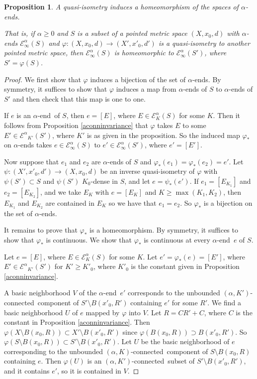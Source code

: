 \documentclass[10pt,a4paper]{amsart}
\newtheorem{proposition}{Proposition}
\newcommand{\aend}{$\alpha$-end}
\newcommand{\akconn}{$(\alpha,K)$-connected}
\newcommand{\akpconn}{$(\alpha,K')$-connected}
\newcommand{\caleinf}{{\mathcal E}^\alpha_\infty}
\newcommand{\calek}{{\mathcal E}^\alpha_K}
\newcommand{\calekp}{{\mathcal E^\alpha}_{K'}}
\newcommand{\ph}{\varphi}
\begin{document}
\begin{proposition}\label{aendinvariance}
A quasi-isometry induces a homeomorphism of the spaces of \aend s.

That is, if $\alpha \geq 0$ and $S$ is a subset of a pointed metric
space $(X,x_0,d)$ with \aend s $\caleinf(S)$ and $\ph: (X,x_0,d) \to
(X',x'_0,d')$ is a quasi-isometry to another pointed metric space,
then $\caleinf(S)$ is homeomorphic to $\caleinf(S')$, where
$S'=\ph(S)$.
\end{proposition}

\begin{proof}
We first show that $\ph$ induces a bijection of the set of \aend s. By
symmetry, it suffices to show that $\ph$ induces a map from \aend s of
$S$ to \aend s of $S'$ and then check that this map is one to one.

If $e$ is an \aend \ of $S$, then $e=[E]$, where $E \in \calek(S)$ for
some $K$. Then it follows from Proposition \ref{aconninvariance} that
$\ph$ takes $E$ to some $E' \in \calekp(S')$, where $K'$ is as given
in the proposition. So the induced map $\ph_*$ on \aend s takes $e \in
\caleinf(S)$ to $e' \in \caleinf(S')$, where $e' = [E']$.

Now suppose that $e_1$ and $e_2$ are \aend s of $S$ and
$\ph_*(e_1)=\ph_*(e_2)=e'$. Let $\psi: (X',x'_0,d') \to (X,x_0,d)$ be
an inverse quasi-isometry of $\ph$ with $\psi(S') \subset S$ and
$\psi(S')$ $K_0$-dense in $S$, and let $e= \psi_*(e')$. If $e_1 =
[E_{K_1}]$ and $e_2 = [E_{K_2}]$, and we take $E_K$ with $e = [E_K]$
and $K \geq \max(K_1,K_2)$, then $E_{K_1}$ and $E_{K_2}$ are contained
in $E_K$ so we have that $e_1 = e_2$. So $\ph_*$ is a bijection on the
set of \aend s.

It remains to prove that $\ph_*$ is a homeomorphism. By symmetry, it
suffices to show that $\ph_*$ is continuous. We show that $\ph_*$ is
continuous at every \aend \ $e$ of $S$.

Let $e=[E]$, where $E \in \calek(S)$ for some $K$. Let $e'=\ph_*(e)
=[E']$, where $E' \in \calekp(S')$ for $K' \geq K'_0$, where $K'_0$ is
the constant given in Proposition \ref{aconninvariance}.

A basic neighborhood $V$ of the \aend\ $e'$ corresponds to the
unbounded \akpconn\ component of $S' \setminus B(x'_0, R')$ containing
$e'$ for some $R'$. We find a basic neighborhood $U$ of $e$ mapped by
$\ph$ into $V$. Let $R=CR'+C$, where $C$ is the constant in
Proposition \ref{aconninvariance}. Then $\ph(X \setminus B(x_0, R))
\subset X' \setminus B(x'_0, R')$ since $\ph(B(x_0, R)) \supset
B(x'_0, R')$. So $\ph(S \setminus B(x_0, R)) \subset S' \setminus
B(x'_0, R')$. Let $U$ be the basic neighborhood of $e$ corresponding
to the unbounded \akconn\ component of $S \setminus B(x_0, R)$
containing $e$. Then $\ph(U)$ is an \akpconn\ subset of $S' \setminus
B(x'_0, R')$, and it contains $e'$, so it is contained in $V$.
\end{proof}
\end{document}

